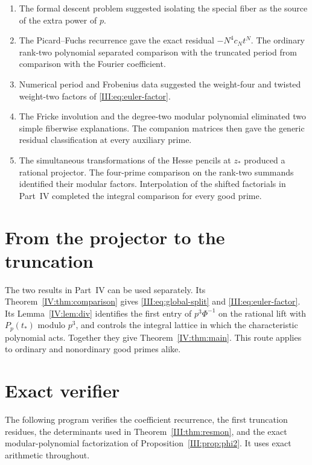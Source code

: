 \documentclass[11pt,letterpaper]{article}
\theoremstyle{definition}
\theoremstyle{remark}
\newcommand{\paperanchors}[1]{%
 \renewcommand{\theHsection}{#1.\arabic{section}}%
 \renewcommand{\theHsubsection}{\theHsection.\arabic{subsection}}%
 \renewcommand{\theHequation}{#1.\arabic{equation}}%
 \renewcommand{\theHtable}{#1.\arabic{table}}%
 \renewcommand{\theHtheorem}{\theHsection.\arabic{theorem}}}
\begin{document}
\begin{enumerate}[leftmargin=*,label=\textup{(\roman*)}]
\item The formal descent problem suggested isolating the special
fiber as the source of the extra power of $p$.
\item The Picard--Fuchs recurrence gave the exact residual
$-N^4c_Nt^N$. The ordinary rank-two polynomial separated comparison
with the truncated period from comparison with the Fourier coefficient.
\item Numerical period and Frobenius data suggested the weight-four
and twisted weight-two factors of \eqref{III:eq:euler-factor}.
\item The Fricke involution and the degree-two modular polynomial
eliminated two simple fiberwise explanations. The companion
matrices then gave the generic residual classification at every
auxiliary prime.
\item The simultaneous transformations of the Hesse pencils at
$z_*$ produced a rational projector. The four-prime comparison on the
rank-two summands identified their modular factors. Interpolation of
the shifted factorials in Part~IV completed the integral comparison
for every good prime.
\end{enumerate}

\section{From the projector to the truncation}

The two results in Part~IV can be used separately. Its
Theorem~\ref{IV:thm:comparison} gives \eqref{III:eq:global-split}
and \eqref{III:eq:euler-factor}. Its Lemma~\ref{IV:lem:div}
identifies the first entry of $p^3\Phi^{-1}$ on the rational lift
with $P_p(t_*)$ modulo $p^3$, and controls the integral lattice in
which the characteristic polynomial acts. Together they give
Theorem~\ref{IV:thm:main}. This route applies to ordinary and
nonordinary good primes alike.

\appendix\paperanchors{III.app}
\section{Exact verifier}\label{III:app:code}

The following program verifies the coefficient recurrence, the first truncation residues, the determinants
used in Theorem~\ref{III:thm:resmon}, and the exact modular-polynomial factorization of
Proposition~\ref{III:prop:phi2}.  It uses exact arithmetic throughout.
\end{document}
